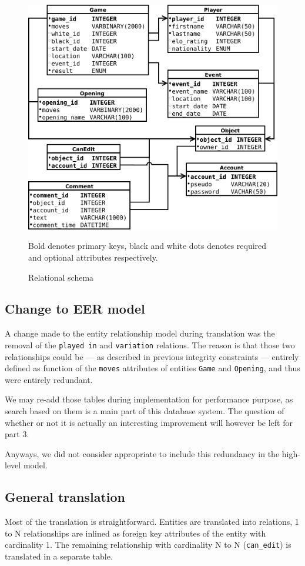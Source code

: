 \documentclass{article}
\begin{document}
\begin{figure}
\caption{Relational schema}
\label{db}
\begin{center}
\includegraphics[scale=0.4]{relational}
\end{center}
Bold denotes primary keys, black and white dots denotes required and optional attributes respectively.
\end{figure}


\subsection{Change to EER model}
A change made to the entity relationship model during translation was the removal of the \verb|played in|
and \verb|variation| relations. The reason is that those two relationships could be --- 
as described in previous integrity constraints --- entirely defined as function of the \verb|moves| attributes 
of entities \verb|Game| and \verb|Opening|, and thus were entirely redundant.

We may re-add those tables during implementation for performance purpose, as search based on them is
a main part of this database system. The question of whether or not it is actually an interesting
improvement will however be left for part 3.

Anyways, we did not consider appropriate to include this redundancy in the high-level model.

\subsection{General translation}
Most of the translation is straightforward.
Entities are translated into relations, 1 to N relationships are inlined as foreign key attributes of the entity with cardinality 1.
The remaining relationship with cardinality N to N (\verb|can_edit|) is translated in a separate table.
\end{document}
